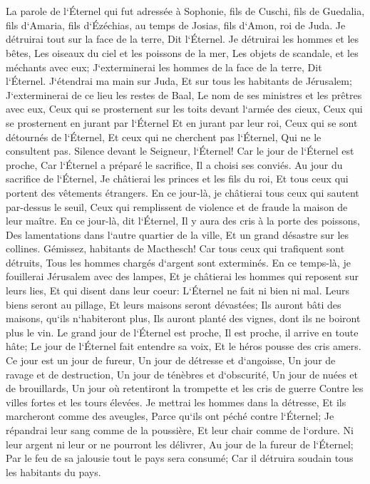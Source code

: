 

\chapter{}

\verse La parole de l`Éternel qui fut adressée à Sophonie, fils de Cuschi, fils de Guedalia, fils d`Amaria, fils d`Ézéchias, au temps de Josias, fils d`Amon, roi de Juda. 
\verse Je détruirai tout sur la face de la terre, Dit l`Éternel. 
\verse Je détruirai les hommes et les bêtes, Les oiseaux du ciel et les poissons de la mer, Les objets de scandale, et les méchants avec eux; J`exterminerai les hommes de la face de la terre, Dit l`Éternel. 
\verse J`étendrai ma main sur Juda, Et sur tous les habitants de Jérusalem; J`exterminerai de ce lieu les restes de Baal, Le nom de ses ministres et les prêtres avec eux, 
\verse Ceux qui se prosternent sur les toits devant l`armée des cieux, Ceux qui se prosternent en jurant par l`Éternel Et en jurant par leur roi, 
\verse Ceux qui se sont détournés de l`Éternel, Et ceux qui ne cherchent pas l`Éternel, Qui ne le consultent pas. 
\verse Silence devant le Seigneur, l`Éternel! Car le jour de l`Éternel est proche, Car l`Éternel a préparé le sacrifice, Il a choisi ses conviés. 
\verse Au jour du sacrifice de l`Éternel, Je châtierai les princes et les fils du roi, Et tous ceux qui portent des vêtements étrangers. 
\verse En ce jour-là, je châtierai tous ceux qui sautent par-dessus le seuil, Ceux qui remplissent de violence et de fraude la maison de leur maître. 
\verse En ce jour-là, dit l`Éternel, Il y aura des cris à la porte des poissons, Des lamentations dans l`autre quartier de la ville, Et un grand désastre sur les collines. 
\verse Gémissez, habitants de Macthesch! Car tous ceux qui trafiquent sont détruits, Tous les hommes chargés d`argent sont exterminés. 
\verse En ce temps-là, je fouillerai Jérusalem avec des lampes, Et je châtierai les hommes qui reposent sur leurs lies, Et qui disent dans leur coeur: L`Éternel ne fait ni bien ni mal. 
\verse Leurs biens seront au pillage, Et leurs maisons seront dévastées; Ils auront bâti des maisons, qu`ils n`habiteront plus, Ils auront planté des vignes, dont ils ne boiront plus le vin. 
\verse Le grand jour de l`Éternel est proche, Il est proche, il arrive en toute hâte; Le jour de l`Éternel fait entendre sa voix, Et le héros pousse des cris amers. 
\verse Ce jour est un jour de fureur, Un jour de détresse et d`angoisse, Un jour de ravage et de destruction, Un jour de ténèbres et d`obscurité, Un jour de nuées et de brouillards, 
\verse Un jour où retentiront la trompette et les cris de guerre Contre les villes fortes et les tours élevées. 
\verse Je mettrai les hommes dans la détresse, Et ils marcheront comme des aveugles, Parce qu`ils ont péché contre l`Éternel; Je répandrai leur sang comme de la poussière, Et leur chair comme de l`ordure. 
\verse Ni leur argent ni leur or ne pourront les délivrer, Au jour de la fureur de l`Éternel; Par le feu de sa jalousie tout le pays sera consumé; Car il détruira soudain tous les habitants du pays. 

